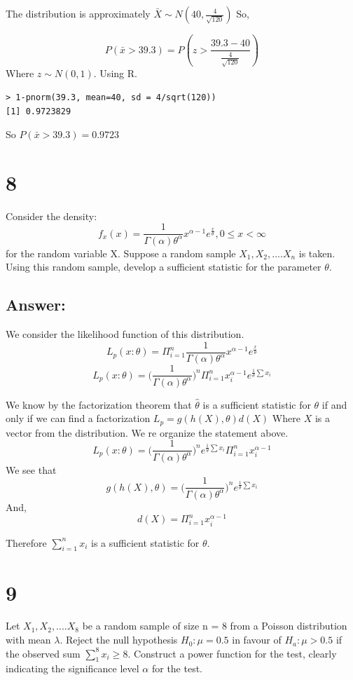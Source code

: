 \documentclass[svgnames]{article}
\begin{document}
The distribution is approximately $\bar{X} \sim N(40, \frac{4}{\sqrt{120}})$
So,

$$P(\bar{x}>39.3) = P(z> \frac{39.3-40}{ \frac{4}{\sqrt{120}}})$$
Where $z\sim N(0,1)$.
\newline
Using R.
\begin{lstlisting}
> 1-pnorm(39.3, mean=40, sd = 4/sqrt(120))
[1] 0.9723829
\end{lstlisting}
So  $P(\bar{x}>39.3) =  0.9723$

\section*{8}
Consider the density:
$$f_{x}(x)=\frac{1}{\Gamma(\alpha)\theta^{\alpha}}x^{\alpha-1}e^\frac{x}{\theta}, 0\leq x < \infty$$
for the random variable X. Suppose a random sample $X_1,X_2,....X_n$ is taken. Using this random sample, develop a
sufficient statistic for the parameter $\theta$.

\subsection*{Answer:}
We consider the likelihood function of this distribution. 
$$L_p(x:\theta)=\Pi_{i=1}^{n}\frac{1}{\Gamma(\alpha)\theta^{\alpha}}x^{\alpha-1}e^\frac{x}{\theta}$$
$$L_p(x:\theta)=\Big(\frac{1}{\Gamma(\alpha)\theta^{\alpha}}\Big)^n \Pi_{i=1}^n x_i^{\alpha-1}e^{\frac{1}{\theta}\sum x_i}$$

We know by the factorization theorem that $\hat{\theta}$ is a sufficient statistic for  $\theta$  if and only if we can find a factorization $L_p = g(h(X), \theta)d(X)$ Where $X$ is a vector from the distribution. 
\newline
We re organize the statement above.
$$L_p(x:\theta)=\Big(\frac{1}{\Gamma(\alpha)\theta^{\alpha}}\Big)^n e^{\frac{1}{\theta}\sum x_i} \Pi_{i=1}^n x_i^{\alpha-1}$$
We see that 
$$g(h(X), \theta) = \Big(\frac{1}{\Gamma(\alpha)\theta^{\alpha}}\Big)^n e^{\frac{1}{\theta}\sum x_i} $$
And,
$$d(X) = \Pi_{i=1}^n x_i^{\alpha-1}$$

Therefore $\sum_{i=1}^{n}x_i$ is a sufficient statistic for $\theta$. 

\section*{9}
Let $X_1,X_2,....X_8$ be a random sample of size n = 8 from a Poisson distribution with mean $\lambda$.
Reject the null hypothesis $H_0: \mu= 0.5$ in favour of $H_a: \mu > 0.5$ if the observed sum $\sum_{1}^{8}x_i \geq 8$. Construct a power function for the test, clearly indicating the significance level $\alpha$ for the test.
\end{document}
